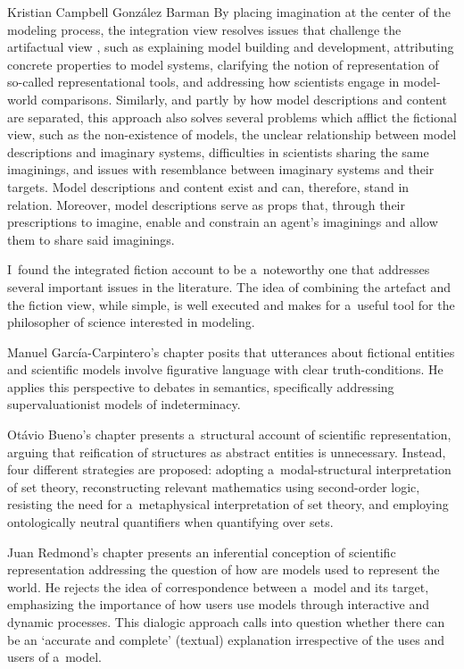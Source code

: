 \begin{recengenv}{Kristian Campbell González Barman}
By placing imagination at the center of the modeling process, the integration view resolves issues that challenge the artifactual view
\parencite*[][p.173]{cassini_models_2021}, %
 such as explaining model building and development, attributing concrete properties to model systems, clarifying the notion of representation of so-called representational tools, and addressing how scientists engage in model-world comparisons. Similarly, and partly by how model descriptions and content are separated, this approach also solves several problems which afflict the fictional view, such as the non-existence of models, the unclear relationship between model descriptions and imaginary systems, difficulties in scientists sharing the same imaginings, and issues with resemblance between imaginary systems and their targets. Model descriptions and content exist and can, therefore, stand in relation. Moreover, model descriptions serve as props that, through their prescriptions to imagine, enable and constrain an agent's imaginings and allow them to share said imaginings.

I~found the integrated fiction account to be a~noteworthy one that addresses several important issues in the literature. The idea of combining the artefact and the fiction view, while simple, is well executed and makes for a~useful tool for the philosopher of science interested in modeling.

Manuel García-Carpintero's chapter posits that utterances about fictional entities and scientific models involve figurative language with clear truth-conditions. He applies this perspective to debates in semantics, specifically addressing supervaluationist models of indeterminacy.

Otávio Bueno's chapter presents a~structural account of scientific representation, arguing that reification of structures as abstract entities is unnecessary. Instead, four different strategies are proposed: adopting a~modal-structural interpretation of set theory, reconstructing relevant mathematics using second-order logic, resisting the need for a~metaphysical interpretation of set theory, and employing ontologically neutral quantifiers when quantifying over sets.

Juan Redmond's chapter presents an inferential conception of scientific representation addressing the question of how are models used to represent the world. He rejects the idea of correspondence between a~model and its target, emphasizing the importance of how users use models through interactive and dynamic processes. This dialogic approach calls into question whether there can be an ‘accurate and complete' (textual) explanation irrespective of the uses and users of a~model.


\end{recengenv}

